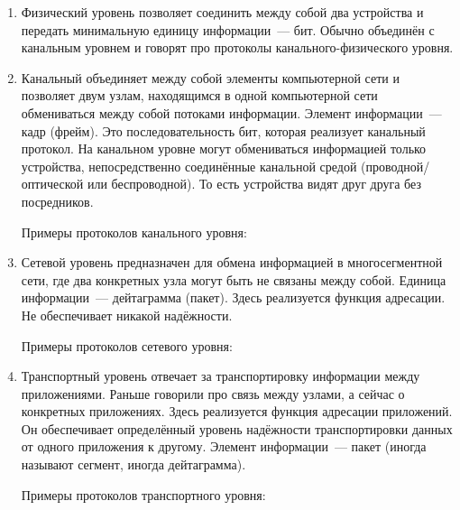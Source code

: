 \begin{enumerate}

\item Физический уровень позволяет соединить между собой два устройства и передать минимальную единицу информации~--- бит. Обычно объединён с канальным уровнем и говорят про протоколы канального-физического уровня.

\item Канальный объединяет между собой элементы компьютерной сети и позволяет двум узлам, находящимся в одной компьютерной сети обмениваться между собой потоками информации. Элемент информации~--- кадр (фрейм). Это последовательность бит, которая реализует канальный протокол. На канальном уровне могут обмениваться информацией только устройства, непосредственно соединённые канальной средой (проводной/оптической или беспроводной). То есть устройства видят друг друга без посредников. 

Примеры протоколов канального уровня: 

\item Сетевой уровень предназначен для обмена информацией в многосегментной сети, где два конкретных узла могут быть не связаны между собой. Единица информации~--- дейтаграмма (пакет). Здесь реализуется функция адресации. Не обеспечивает никакой надёжности.

Примеры протоколов сетевого уровня:

\item Транспортный уровень отвечает за транспортировку информации между приложениями. Раньше говорили про связь между узлами, а сейчас о конкретных приложениях. Здесь реализуется функция адресации приложений. Он обеспечивает определённый уровень надёжности транспортировки данных от одного приложения к другому. Элемент информации~--- пакет (иногда называют сегмент, иногда дейтаграмма).

Примеры протоколов транспортного уровня:


\end{enumerate}
